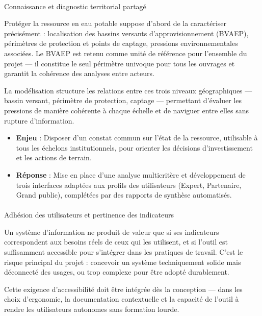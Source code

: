 \documentclass[
  11pt,
]{article}
\makeatletter
\let\oldparagraph\paragraph
\renewcommand{\paragraph}{
    \@ifstar
      \xxxParagraphStar
      \xxxParagraphNoStar
  }
\newcommand{\xxxParagraphStar}[1]{\oldparagraph*{#1}\mbox{}}
\newcommand{\xxxParagraphNoStar}[1]{\oldparagraph{#1}\mbox{}}
\providecommand{\tightlist}{%
  \setlength{\itemsep}{0pt}\setlength{\parskip}{0pt}}\usepackage{longtable,booktabs,array}
\makeatother
\begin{document}
\paragraph{Connaissance et diagnostic territorial
partagé}\label{connaissance-et-diagnostic-territorial-partaguxe9}

Protéger la ressource en eau potable suppose d'abord de la caractériser
précisément : localisation des bassins versants d'approvisionnement
(BVAEP), périmètres de protection et points de captage, pressions
environnementales associées. Le BVAEP est retenu comme unité de
référence pour l'ensemble du projet --- il constitue le seul périmètre
univoque pour tous les ouvrages et garantit la cohérence des analyses
entre acteurs.

La modélisation structure les relations entre ces trois niveaux
géographiques --- bassin versant, périmètre de protection, captage ---
permettant d'évaluer les pressions de manière cohérente à chaque échelle
et de naviguer entre elles sans rupture d'information.

\begin{itemize}
\tightlist
\item
  \textbf{Enjeu} : Disposer d'un constat commun sur l'état de la
  ressource, utilisable à tous les échelons institutionnels, pour
  orienter les décisions d'investissement et les actions de terrain.
\item
  \textbf{Réponse} : Mise en place d'une analyse multicritère et
  développement de trois interfaces adaptées aux profils des
  utilisateurs (Expert, Partenaire, Grand public), complétées par des
  rapports de synthèse automatisés.
\end{itemize}

\paragraph{Adhésion des utilisateurs et pertinence des
indicateurs}\label{adhuxe9sion-des-utilisateurs-et-pertinence-des-indicateurs}

Un système d'information ne produit de valeur que si ses indicateurs
correspondent aux besoins réels de ceux qui les utilisent, et si l'outil
est suffisamment accessible pour s'intégrer dans les pratiques de
travail. C'est le risque principal du projet : concevoir un système
techniquement solide mais déconnecté des usages, ou trop complexe pour
être adopté durablement.

Cette exigence d'accessibilité doit être intégrée dès la conception ---
dans les choix d'ergonomie, la documentation contextuelle et la capacité
de l'outil à rendre les utilisateurs autonomes sans formation lourde.
\end{document}
